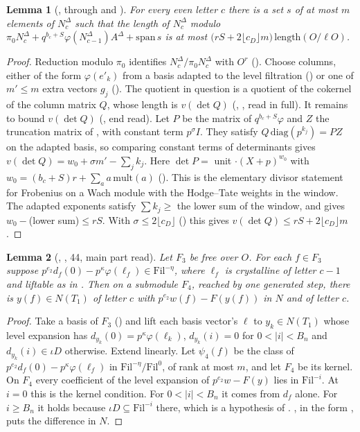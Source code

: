 \documentclass[11pt]{article}
\newcommand{\NN}{N^{\Delta}}
\newcommand{\Fil}{\mathrm{Fil}}
\newtheorem{lemma}{Lemma}
\theoremstyle{definition}
\theoremstyle{remark}
\begin{document}
\begin{lemma}[, through  and ]
For every even letter $c$ there is a set $s$ of at most $m$ elements of $\NN_c$ such that the length of $\NN_c$ modulo $\pi_0\NN_c+q^{b_c+S}\varphi(\NN_{c-1})A^\Delta+\mathrm{span}\,s$ is at most $\bigl(rS+2\lfloor c_D\rfloor m\bigr)\,\mathrm{length}(O/\ell O)$.
\end{lemma}

\begin{proof}
Reduction modulo $\pi_0$ identifies $\NN_c/\pi_0\NN_c$ with $O^r$ (). Choose columns, either of the form $\varphi(e'_k)$ from a basis adapted to the level filtration () or one of $m'\le m$ extra vectors $g_j$ (). The quotient in question is a quotient of the cokernel of the column matrix $Q$, whose length is $v(\det Q)$ (, , read in full). It remains to bound $v(\det Q)$ (, end read). Let $P$ be the matrix of $q^{b_c+S}\varphi$ and $Z$ the truncation matrix of , with constant term $p^\sigma I$. They satisfy $Q\,\mathrm{diag}(p^{k_j})=PZ$ on the adapted basis, so comparing constant terms of determinants gives $v(\det Q)=w_0+\sigma m'-\sum_jk_j$. Here $\det P=$ unit $\cdot(X+p)^{w_0}$ with $w_0=(b_c+S)r+\sum_aa\,\mathrm{mult}(a)$ (). This is the elementary divisor statement for Frobenius on a Wach module with the Hodge--Tate weights in the window. The adapted exponents satisfy $\sum k_j\ge$ the lower sum of the window, and  gives $w_0-$(lower sum)$\le rS$. With $\sigma\le2\lfloor c_D\rfloor$ () this gives $v(\det Q)\le rS+2\lfloor c_D\rfloor m$.
\end{proof}

\begin{lemma}[, , 44, main part read]
Let $F_3$ be free over $O$. For each $f\in F_3$ suppose $p^{e_2}d_f(0)-p^\kappa\varphi(\ell_f)\in\Fil^{-\eta}$, where $\ell_f$ is crystalline of letter $c-1$ and liftable as in . Then on a submodule $F_4$, reached by one generated step, there is $y(f)\in N(T_1)$ of letter $c$ with $p^{e_2}w(f)-F(y(f))$ in $N$ and of letter $c$.
\end{lemma}

\begin{proof}
Take a basis of $F_3$ () and lift each basis vector's $\ell$ to $y_k\in N(T_1)$ whose level expansion has $d_{y_k}(0)=p^\kappa\varphi(\ell_k)$, $d_{y_k}(i)=0$ for $0<\lvert i\rvert<B_n$ and $d_{y_k}(i)\in\iota D$ otherwise. Extend linearly. Let $\psi_4(f)$ be the class of $p^{e_2}d_f(0)-p^\kappa\varphi(\ell_f)$ in $\Fil^{-\eta}/\Fil^0$, of rank at most $m$, and let $F_4$ be its kernel. On $F_4$ every coefficient of the level expansion of $p^{e_2}w-F(y)$ lies in $\Fil^{-i}$. At $i=0$ this is the kernel condition. For $0<\lvert i\rvert<B_n$ it comes from $d_f$ alone. For $i\ge B_n$ it holds because $\iota D\subseteq\Fil^{-i}$ there, which is a hypothesis of . , in the form , puts the difference in $N$.
\end{proof}
\end{document}
